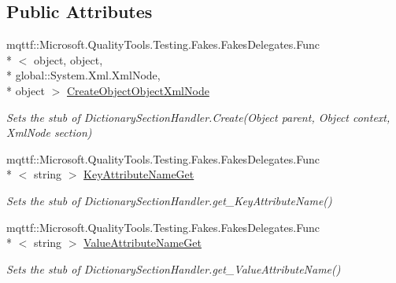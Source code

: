 \subsection*{Public Attributes}
\begin{DoxyCompactItemize}
\item 
mqttf\-::\-Microsoft.\-Quality\-Tools.\-Testing.\-Fakes.\-Fakes\-Delegates.\-Func\\*
$<$ object, object, \\*
global\-::\-System.\-Xml.\-Xml\-Node, \\*
object $>$ \hyperlink{class_system_1_1_configuration_1_1_fakes_1_1_stub_dictionary_section_handler_a4a54df1245822881d6d648d7b7d43eae}{Create\-Object\-Object\-Xml\-Node}
\begin{DoxyCompactList}\small\item\em Sets the stub of Dictionary\-Section\-Handler.\-Create(\-Object parent, Object context, Xml\-Node section)\end{DoxyCompactList}\item 
mqttf\-::\-Microsoft.\-Quality\-Tools.\-Testing.\-Fakes.\-Fakes\-Delegates.\-Func\\*
$<$ string $>$ \hyperlink{class_system_1_1_configuration_1_1_fakes_1_1_stub_dictionary_section_handler_a2383ff7c2b13cc23f3a75b4bd472b27c}{Key\-Attribute\-Name\-Get}
\begin{DoxyCompactList}\small\item\em Sets the stub of Dictionary\-Section\-Handler.\-get\-\_\-\-Key\-Attribute\-Name()\end{DoxyCompactList}\item 
mqttf\-::\-Microsoft.\-Quality\-Tools.\-Testing.\-Fakes.\-Fakes\-Delegates.\-Func\\*
$<$ string $>$ \hyperlink{class_system_1_1_configuration_1_1_fakes_1_1_stub_dictionary_section_handler_a00149579e7e9b4efcfca7f841b93ec95}{Value\-Attribute\-Name\-Get}
\begin{DoxyCompactList}\small\item\em Sets the stub of Dictionary\-Section\-Handler.\-get\-\_\-\-Value\-Attribute\-Name()\end{DoxyCompactList}\end{DoxyCompactItemize}
